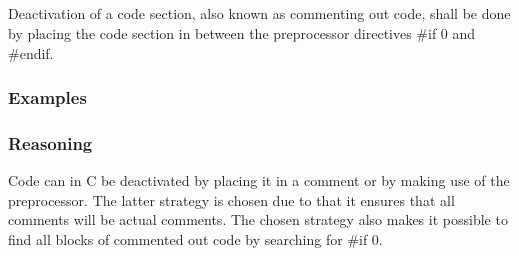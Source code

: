 \subsection*{\codingRule{}}

Deactivation of a code section, also known as commenting out code, shall be done by placing the code section in between the preprocessor directives \#if 0 and \#endif.

\subsubsection*{Examples}

\noindent
\begin{minipage}[t]{\codelstwidth\linewidth}
    
\end{minipage}
\hfill
\begin{minipage}[t]{\codelstwidth\linewidth}
    
\end{minipage}

\subsubsection*{Reasoning}

Code can in C be deactivated by placing it in a comment or by making use of the preprocessor. The latter strategy is chosen due to that it ensures that all comments will be actual comments. The chosen strategy also makes it possible to find all blocks of commented out code by searching for \#if 0.
